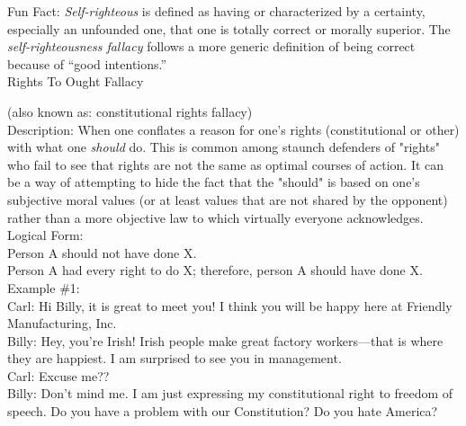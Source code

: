 \documentclass[a4paper,12pt,single,pdftex]{scrbook}
\begin{document}
    
      Fun Fact: {\em Self-righteous} is defined as having or characterized by a certainty, especially an unfounded one, that one is totally correct or morally superior. The {\em self-righteousness fallacy} follows a more generic definition of being correct because of “good intentions.”
    \\

  

Rights To Ought Fallacy
    
      (also known as: constitutional rights fallacy)
    \\

  
    
      Description: When one conflates a reason for one's rights (constitutional or other) with what one {\it should} do.  This is common among staunch defenders of "rights" who fail to see that rights are not the same as optimal courses of action.  It can be a way of attempting to hide the fact that the "should" is based on one's subjective moral values (or at least values that are not shared by the opponent) rather than a more objective law to which virtually everyone acknowledges.
    \\

    
      Logical Form:
    \\

    
      Person A should not have done X.
    \\

    
      Person A had every right to do X; therefore, person A should have done X.
    \\

    
      Example \#1:
    \\

    
      Carl: Hi Billy, it is great to meet you! I think you will be happy here at Friendly Manufacturing, Inc.
    \\

    
      Billy: Hey, you're Irish!  Irish people make great factory workers—that is where they are happiest.  I am surprised to see you in management. 
    \\

    
      Carl: Excuse me??
    \\

    
      Billy: Don't mind me.  I am just expressing my constitutional right to freedom of speech.  Do you have a problem with our Constitution?  Do you hate America?
    \\
\end{document}
